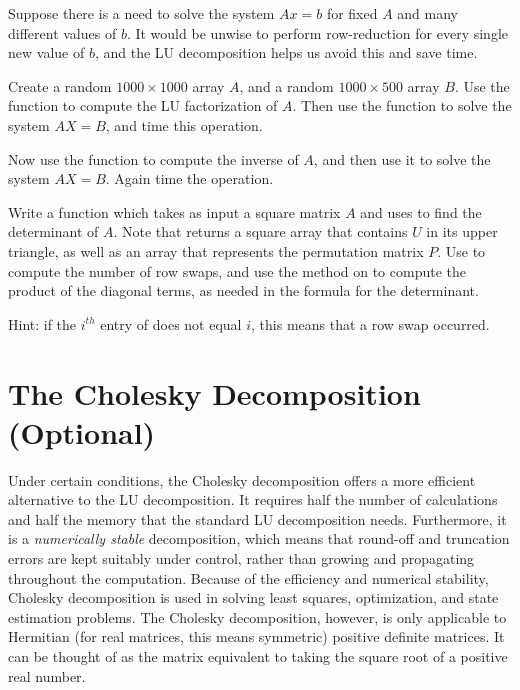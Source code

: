 \begin{problem}
\label{prob:Solve}
Suppose there is a need to solve the system $Ax = b$ for fixed $A$ and many
different values of $b$. It would be unwise to perform row-reduction for
every single new value of $b$, and the LU decomposition helps us avoid this
and save time.

Create a random $1000 \times 1000$ array $A$, and a random $1000 \times 500$ array
$B$. Use the  function to compute the LU factorization of 
$A$. Then use the  function to solve the system $AX = B$,
and time this operation. 

Now use the  function to compute the inverse of $A$, and then
use it to solve the system $AX = B$. Again time the operation. 

\end{problem}

%
\begin{problem}
\label{prob:det}
Write a function which takes as input a square matrix $A$ and uses  to 
find the determinant of $A$. Note that  returns a square array 
that contains $U$ in its upper triangle, as well as an array  that represents the 
permutation matrix $P$. Use  to compute the number of row swaps, and use the
 method on  to compute the product of the diagonal terms, as needed in the
formula for the determinant.

Hint: if the $i^{th}$ entry of  does not equal $i$, this means that a row swap occurred.
\end{problem}

\section*{The Cholesky Decomposition (Optional)}

Under certain conditions, the Cholesky decomposition offers a more efficient alternative to the LU decomposition.
It requires half the number of calculations and half the memory that the standard LU decomposition needs.
Furthermore, it is a \emph{numerically stable} decomposition, which means that round-off and truncation errors are kept suitably under control, rather than growing and propagating throughout the computation.
Because of the efficiency and numerical stability, Cholesky decomposition is used in solving least squares, optimization, and state estimation problems.
The Cholesky decomposition, however, is only applicable to Hermitian (for real matrices, this means symmetric) positive definite matrices.
It can be thought of as the matrix equivalent to taking the square root of a positive real number.

